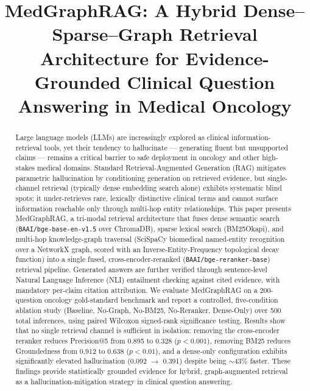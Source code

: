 \documentclass[conference]{IEEEtran}
\begin{document}
\title{MedGraphRAG: A Hybrid Dense--Sparse--Graph Retrieval Architecture for Evidence-Grounded Clinical Question Answering in Medical Oncology}

\author{
\and
{}
}

\maketitle

\begin{abstract}
Large language models (LLMs) are increasingly explored as clinical information-retrieval tools, yet their tendency to hallucinate --- generating fluent but unsupported claims --- remains a critical barrier to safe deployment in oncology and other high-stakes medical domains. Standard Retrieval-Augmented Generation (RAG) mitigates parametric hallucination by conditioning generation on retrieved evidence, but single-channel retrieval (typically dense embedding search alone) exhibits systematic blind spots: it under-retrieves rare, lexically distinctive clinical terms and cannot surface information reachable only through multi-hop entity relationships. This paper presents MedGraphRAG, a tri-modal retrieval architecture that fuses dense semantic search (\texttt{BAAI/bge-base-en-v1.5} over ChromaDB), sparse lexical search (BM25Okapi), and multi-hop knowledge-graph traversal (SciSpaCy biomedical named-entity recognition over a NetworkX graph, scored with an Inverse-Entity-Frequency topological decay function) into a single fused, cross-encoder-reranked (\texttt{BAAI/bge-reranker-base}) retrieval pipeline. Generated answers are further verified through sentence-level Natural Language Inference (NLI) entailment checking against cited evidence, with mandatory per-claim citation attribution. We evaluate MedGraphRAG on a 200-question oncology gold-standard benchmark and report a controlled, five-condition ablation study (Baseline, No-Graph, No-BM25, No-Reranker, Dense-Only) over 500 total inferences, using paired Wilcoxon signed-rank significance testing. Results show that no single retrieval channel is sufficient in isolation: removing the cross-encoder reranker reduces Precision@5 from 0.895 to 0.328 ($p<0.001$), removing BM25 reduces Groundedness from 0.912 to 0.638 ($p<0.01$), and a dense-only configuration exhibits significantly elevated hallucination (0.092 $\rightarrow$ 0.391) despite being $\sim$43\% faster. These findings provide statistically grounded evidence for hybrid, graph-augmented retrieval as a hallucination-mitigation strategy in clinical question answering.
\end{abstract}
\end{document}
